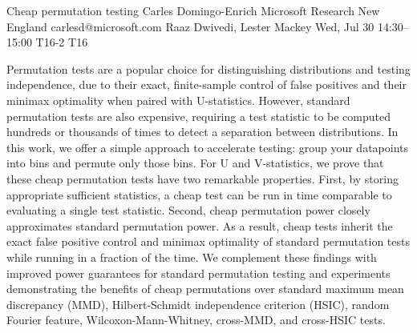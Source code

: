 \documentclass[12pt,lettersize,oneside]{book} %
\begin{document}
\begin{talk}
  {Cheap permutation testing}%
  {Carles Domingo-Enrich}%
  {Microsoft Research New England}%
  {carlesd@microsoft.com}%
  {Raaz Dwivedi, Lester Mackey}%
  {}%
  {Wed, Jul 30 14:30--15:00}%
  {T16-2}%
  {T16}%
  
    
   
Permutation tests are a popular choice for distinguishing distributions and testing independence, due to their exact, finite-sample control of false positives and their minimax optimality when paired with U-statistics. However, standard permutation tests are also expensive, requiring a test statistic to be computed hundreds or thousands of times to detect a separation between distributions. In this work, we offer a simple approach to accelerate testing: group your datapoints into bins and permute only those bins. For U and V-statistics, we prove that these cheap permutation tests have two remarkable properties. First, by storing appropriate sufficient statistics, a cheap test can be run in time comparable to evaluating a single test statistic. Second, cheap permutation power closely approximates standard permutation power. As a result, cheap tests inherit the exact false positive control and minimax optimality of standard permutation tests while running in a fraction of the time. We complement these findings with improved power guarantees for standard permutation testing and experiments demonstrating the benefits of cheap permutations over standard maximum mean discrepancy (MMD), Hilbert-Schmidt independence criterion (HSIC), random Fourier feature, Wilcoxon-Mann-Whitney, cross-MMD, and cross-HSIC tests.



\end{talk}
\end{document}
